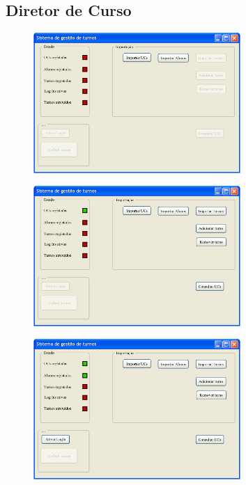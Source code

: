 \documentclass[12pt,a4paper]{report}
\begin{document}
\begin{appendices}
\section{Diretor de Curso}

\begin{figure}[H]
	\centering 
	\includegraphics[width=0.7\textwidth]{modelacao/mockups/admin00000.png}  
\end{figure}

\begin{figure}[H]
	\centering 
	\includegraphics[width=0.7\textwidth]{modelacao/mockups/admin10000.png}  
\end{figure}

\begin{figure}
    \centering
    \includegraphics[width=0.7\textwidth]{modelacao/mockups/admin11000.png}
\end{figure}


\end{appendices}
\end{document}
